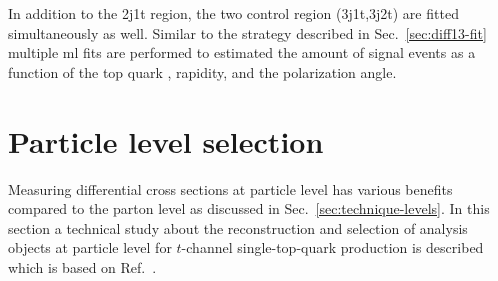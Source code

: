 
In addition to the 2j1t region, the two \ttbar control region (3j1t,3j2t) are fitted simultaneously as well. Similar to the strategy described in Sec.~\ref{sec:diff13-fit} multiple \gls{ml} fits are performed to estimated the amount of signal events as a function of the top quark \pt, rapidity, and the polarization angle.

 

\section{Particle level selection}
\label{sec:prospects-fiducial-studies}

Measuring differential cross sections at particle level has various benefits compared to the parton level as discussed in Sec.~\ref{sec:technique-levels}. In this section a technical study about the reconstruction and selection of analysis objects at particle level for $t$-channel single-top-quark production is described which is based on Ref.~\cite{particleStudies}.


